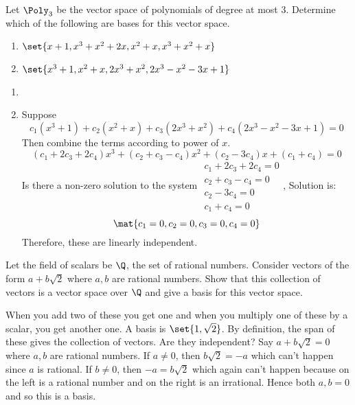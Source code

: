 \begin{ex}
  Let $\Poly_3$ be the vector space of polynomials of degree at most
  3. Determine which of the following are bases for this vector space.

  \begin{enumerate}
  \item $\set{x+1,x^{3}+x^{2}+2x,x^{2}+x,x^{3}+x^{2}+x} $

  \item $\set{x^{3}+1,x^{2}+x,2x^{3}+x^{2},2x^{3}-x^{2}-3x+1} $
  \end{enumerate}

  \begin{sol}
    \begin{enumerate}
    \item
    \item
      Suppose
      \begin{equation*}
        c_{1}(x^{3}+1) +c_{2}(x^{2}+x) +c_{3}(
        2x^{3}+x^{2}) +c_{4}(2x^{3}-x^{2}-3x+1) =0
      \end{equation*}
      Then combine the terms according to power of $x$.
      \begin{equation*}
        (c_{1}+2c_{3}+2c_{4}) x^{3}+(c_{2}+c_{3}-c_{4})
        x^{2}+(c_{2}-3c_{4}) x+(c_{1}+c_{4}) =0
      \end{equation*}
      Is there a non-zero solution to the system $
      \begin{array}{c}
        c_{1}+2c_{3}+2c_{4}=0 \\
        c_{2}+c_{3}-c_{4}=0 \\
        c_{2}-3c_{4}=0 \\
        c_{1}+c_{4}=0
      \end{array}
      $, Solution is:
      \begin{equation*}
        \mat{c_{1}=0,c_{2}=0,c_{3}=0,c_{4}=0}
      \end{equation*}
      Therefore, these are linearly independent.
    \end{enumerate}
  \end{sol}
\end{ex}

\begin{ex}
  Let the field of scalars be $\Q$, the set of rational
  numbers. Consider vectors of the form $a+b\sqrt{2}$ where $a,b$ are
  rational numbers. Show that this collection of vectors is a vector
  space over $\Q$ and give a basis for this vector space.
  \begin{sol}
    When you add two of these you get one and when you multiply one of these by
    a scalar, you get another one. A basis is $\set{1,\sqrt{2}}$. By
    definition, the span of these gives the collection of vectors. Are they
    independent? Say $a+b\sqrt{2}=0$ where $a,b$ are rational numbers. If $a\neq
    0$, then $b\sqrt{2}=-a$ which can't happen since $a$ is rational. If $b\neq
    0$, then $-a=b\sqrt{2}$ which again can't happen because on the left is a
    rational number and on the right is an irrational. Hence both $a,b=0$ and so
    this is a basis.
  \end{sol}
\end{ex}

